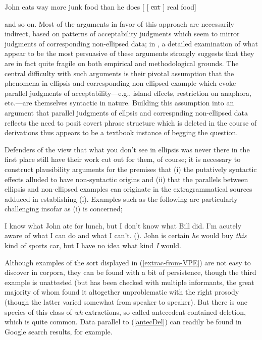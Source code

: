 \documentclass[output=paper,colorlinks,citecolor=brown]{langscibook}
\begin{document}
\begin{exe}
 \ex\label{pseudodeletion}
  John eats way more junk food than he does [ [ \sout{eat} {\gp}\xspace ] real food]
\end{exe}
and so on. Most of the arguments in favor of this approach are
necessarily indirect, based on patterns of acceptability judgments which seem to
mirror judgments of corresponding non-ellipsed data; in \citet{kubotalevineBook}, a
detailed examination of what appear to be the most persuasive of these
arguments strongly suggests that they are in fact quite fragile on
both empirical and methodological grounds. The central difficulty with
such arguments is their pivotal assumption  that
the phenomena in  ellipsis and corresponding non-ellipsed example
which evoke parallel judgments of acceptability---e.g., island effects,
restriction on anaphora, etc.---are themselves syntactic in
nature. Building this assumption into an argument that parallel
judgments of ellpsis and correspnding non-ellipsed data reflects the
need to posit covert phrase structure which is deleted in the course
of derivations thus appears to be a textbook instance of begging the question. 

Defenders of the view that what you don't see in ellipsis was never
there in the first place still have their work cut out for them, of
course; it is necessary to construct plausibility arguments for the
premises that (i) the putatively syntactic effects alluded to have
non-syntactic origins and (ii) that the parallels between ellipsis and
non-ellipsed examples can originate in the extragrammatical sources
adduced in establishing (i). Examples such as the following are
particularly challenging insofar as (i) is concerned;


\begin{exe}
 \ex\label{extrac-from-VPE}
  \begin{xlist}
 \ex\label{}
    I know what John ate for lunch,  but I don't know what Bill did.
 \ex\label{}
    I'm acutely aware of what I can do and what I
  can't. (\citet[735]{mahoney2004}).
 \ex\label{}
    John is certain \textsl{he} would buy \textsl{this} kind of sports car, but I have no idea what kind \textsl{I} would.
  \end{xlist}
\end{exe}
Although examples of the sort displayed in (\ref{extrac-from-VPE}) are not
easy to discover in corpora, they can be found with a bit of
persistence, though the third example is unattested (but has been
checked with multiple informants, the great majority of whom found it
altogether unproblematic with the right prosody (though the latter
varied somewhat from speaker to speaker). But there is one species of this class of
\textit{wh}-extractions, so called antecedent-contained deletion,  which is
quite common. Data parallel to (\ref{antecDel}) can readily be found in
Google search results, for example.
\end{document}
